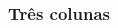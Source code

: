 \documentclass[aspectratio=169]{beamer}
\begin{document}
\begin{frame}[fragile] \frametitle{Três colunas}
\vspace{-1em}
\begin{columns}[t]
\begin{column}{0.32\linewidth}
  \begin{block}{\lipsum[1][14]}
    \lipsum[1][15-16]
    \vspace{1em}
    \lipsum[1][17-18]
  \end{block}
\end{column}
\begin{column}{0.32\linewidth}
  \begin{block}{\lipsum[2][1]}
    \lipsum[2][2-4]
  \end{block}
\end{column}
\begin{column}{0.32\linewidth}
  \vspace{6pt}
  \begin{exampleblock}{}
  \end{exampleblock}
\end{column}
\end{columns}
\end{frame}
\end{document}
